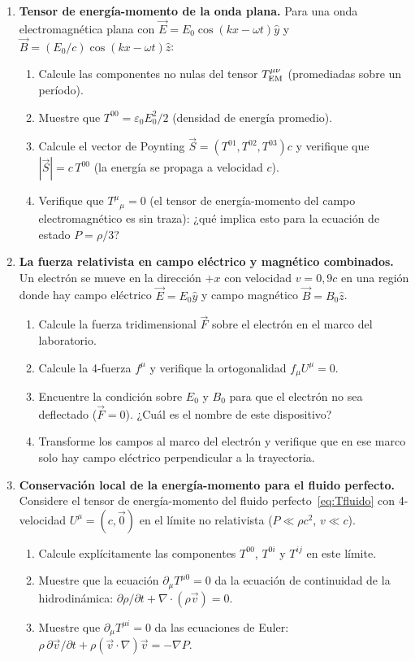 \begin{enumerate}[leftmargin=2em, label=\textbf{P\thechapter.\arabic*.}]
  \item \textbf{Tensor de energía-momento de la onda plana.}
  Para una onda electromagnética plana con $\vec{E} = E_0\cos(kx - \omega t)\hat{y}$ y $\vec{B} = (E_0/c)\cos(kx - \omega t)\hat{z}$:
  \begin{enumerate}[label=(\alph*)]
    \item Calcule las componentes no nulas del tensor $T^{\mu\nu}_{\rm EM}$ (promediadas sobre un período).
    \item Muestre que $T^{00} = \varepsilon_0 E_0^2/2$ (densidad de energía promedio).
    \item Calcule el vector de Poynting $\vec{S} = (T^{01}, T^{02}, T^{03})c$ y verifique que $|\vec{S}| = c\,T^{00}$ (la energía se propaga a velocidad $c$).
    \item Verifique que $T^\mu{}_\mu = 0$ (el tensor de energía-momento del campo electromagnético es sin traza): ¿qué implica esto para la ecuación de estado $P = \rho/3$?
  \end{enumerate}

  \item \textbf{La fuerza relativista en campo eléctrico y magnético combinados.}
  Un electrón se mueve en la dirección $+x$ con velocidad $v = 0{,}9c$ en una región donde hay campo eléctrico $\vec{E} = E_0\hat{y}$ y campo magnético $\vec{B} = B_0\hat{z}$.
  \begin{enumerate}[label=(\alph*)]
    \item Calcule la fuerza tridimensional $\vec{F}$ sobre el electrón en el marco del laboratorio.
    \item Calcule la 4-fuerza $f^\mu$ y verifique la ortogonalidad $f_\mu U^\mu = 0$.
    \item Encuentre la condición sobre $E_0$ y $B_0$ para que el electrón no sea deflectado ($\vec{F} = 0$). ¿Cuál es el nombre de este dispositivo?
    \item Transforme los campos al marco del electrón y verifique que en ese marco solo hay campo eléctrico perpendicular a la trayectoria.
  \end{enumerate}

  \item \textbf{Conservación local de la energía-momento para el fluido perfecto.}
  Considere el tensor de energía-momento del fluido perfecto~\eqref{eq:Tfluido} con 4-velocidad $U^\mu = (c, \vec{0})$ en el límite no relativista ($P \ll \rho c^2$, $v \ll c$).
  \begin{enumerate}[label=(\alph*)]
    \item Calcule explícitamente las componentes $T^{00}$, $T^{0i}$ y $T^{ij}$ en este límite.
    \item Muestre que la ecuación $\partial_\mu T^{\mu 0} = 0$ da la ecuación de continuidad de la hidrodinámica: $\partial\rho/\partial t + \nabla\cdot(\rho\vec{v}) = 0$.
    \item Muestre que $\partial_\mu T^{\mu i} = 0$ da las ecuaciones de Euler: $\rho\,\partial\vec{v}/\partial t + \rho(\vec{v}\cdot\nabla)\vec{v} = -\nabla P$.
  \end{enumerate}


\end{enumerate}
